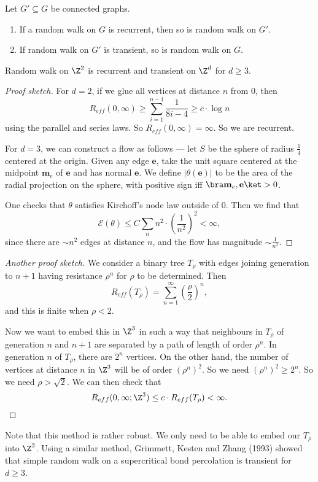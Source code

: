 \documentclass[a4paper]{article}
\begin{document}
\begin{cor}
  Let $G' \subseteq G$ be connected graphs.
  \begin{enumerate}
    \item If a random walk on $G$ is recurrent, then so is random walk on $G'$.
    \item If random walk on $G'$ is transient, so is random walk on $G$.
  \end{enumerate}
\end{cor}

\begin{thm}
  Random walk on $\Z^2$ is recurrent and transient on $\Z^d$ for $d \geq 3$.
\end{thm}

\begin{proof}[Proof sketch]
  For $d = 2$, if we glue all vertices at distance $n$ from $0$, then
  \[
    R_{eff}(0, \infty) \geq \sum_{i = 1}^{n - 1} \frac{1}{8i - 4} \geq c \cdot \log n
  \]
  using the parallel and series laws. So $R_{eff}(0, \infty) = \infty$. So we are recurrent.

  For $d = 3$, we can construct a flow as follows --- let $S$ be the sphere of radius $\frac{1}{4}$ centered at the origin. Given any edge $\mathbf{e}$, take the unit square centered at the midpoint $\mathbf{m}_e$ of $\mathbf{e}$ and has normal $\mathbf{e}$. We define $|\theta(\mathbf{e})|$ to be the area of the radial projection on the sphere, with positive sign iff $\bra \mathbf{m}_e, \mathbf{e} \ket > 0$.

  One checks that $\theta$ satisfies Kirchoff's node law outside of $0$. Then we find that
  \[
    \mathcal{E}(\theta) \leq C \sum_n n^2 \cdot \left(\frac{1}{n^2}\right)^2 < \infty,
  \]
  since there are $\sim n^2$ edges at distance $n$, and the flow has magnitude $\sim \frac{1}{n^2}$.
\end{proof}

\begin{proof}[Another proof sketch]
  We consider a binary tree $T_\rho$ with edges joining generation to $n + 1$ having resistance $\rho^n$ for $\rho$ to be determined. Then
  \[
    R_{eff}(T_\rho) = \sum_{n = 1}^\infty \left(\frac{\rho}{2}\right)^n,
  \]
  and this is finite when $\rho < 2$.

  Now we want to embed this in $\Z^3$ in such a way that neighbours in $T_\rho$ of generation $n$ and $n + 1$ are separated by a path of length of order $\rho^n$. In generation $n$ of $T_\rho$, there are $2^n$ vertices. On the other hand, the number of vertices at distance $n$ in $\Z^3$ will be of order $(\rho^n)^2$. So we need $(\rho^n)^2 \geq 2^n$. So we need $\rho > \sqrt{2}$. We can then check that
  \[
    R_{eff}(0, \infty; \Z^3) \leq c \cdot R_{eff}(T_\rho) < \infty.
  \]
\end{proof}
Note that this method is rather robust. We only need to be able to embed our $T_\rho$ into $\Z^3$. Using a similar method, Grimmett, Kesten and Zhang (1993) showed that simple random walk on a supercritical bond percolation is transient for $d \geq 3$.
\end{document}
